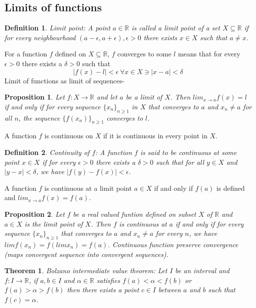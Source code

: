 \documentclass[12pt]{report}
\newtheorem{thm}{Theorem}
\newtheorem{defn}{Definition}
\newtheorem{prop}{Proposition}
\begin{document}
\subsection*{Limits of functions}
\begin{defn}
    Limit point: A point $a \in \mathbb{R}$ is called a limit point of a set $X \subseteq \mathbb{R}$ if for every neighbourhood $(a - \epsilon, a+ \epsilon), \epsilon>0$ there exists $x \in X$ such that $a \neq x$.  
\end{defn}
For a function $f$ defined on $X \subseteq \mathbb{R}$, $f$ converges to some $l$ means that for every $\epsilon > 0$ there exists a $\delta > 0$ such that
$$ |f(x) - l| < \epsilon ~\forall x \in X \ni |x - a| < \delta$$ 
Limit of functions as limit of sequences-
\begin{prop}
    Let $f:X\to \mathbb{R}$ and let $a$ be a limit of $X$. Then $lim_{x \to a} f(x) = l$ if and only if for every sequence $\{x_n\}_{n \geq 1}$ in $X$ that converges to $a$ and $x_n \neq a$ for all $n$, the sequence $\{f(x_n)\}_{n \geq 1}$ converges to $l$. 
\end{prop}
A function $f$ is continuous on $X$ if it is continuous in every point in $X$.
\begin{defn}
    Continuity of $f$: A function $f$ is said to be continuous at some point $x \in X$ if for every $\epsilon > 0$ there exists a $\delta > 0$ such that for all $y \in X$ and $|y - x| < \delta$, we have $|f(y) - f(x)| < \epsilon$.
\end{defn}
A function $f$ is continuous at a limit point $a \in X$ if and only if $f(a)$ is defined and $ lim_{x \to a} f(x) = f(a)$.
\begin{prop}
    Let $f$ be a real valued funtion defined on subset $X$ of $\mathbb{R}$ and $a \in X$ is the limit point of $X$. Then $f$ is continuous at $a$ if and only if for every sequence $\{x_n\}_{n \geq 1}$ that converges to $a$ and $x_n \neq a$ for every $n$, we have $lim f(x_n) = f(lim x_n) = f(a)$. Continuous function preserve convergence (maps convergent sequence into convergent sequences).  
\end{prop}
\begin{thm}
    Bolzano intermediate value theorem: Let $I$ be an interval and $f: I \to \mathbb{R}$, if $a,b \in I$ and $\alpha \in \mathbb{R}$ satisfies $f(a) < \alpha < f(b)$ or $f(a) > \alpha > f(b)$ then there exists a point $c \in I$ between $a$ and $b$ such that $f(c) = \alpha$.
\end{thm}
\end{document}
